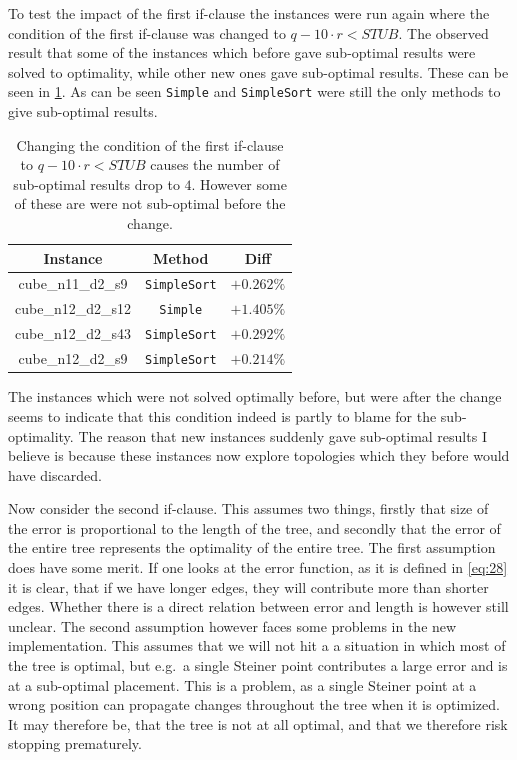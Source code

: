 To test the impact of the first if-clause the instances were run again where the
condition of the first if-clause was changed to $q - 10 \cdot r <
\textit{STUB}$. The observed result that some of the instances which before gave
sub-optimal results were solved to optimality, while other new ones gave
sub-optimal results. These can be seen in \cref{tab:correctness-errors-4}. As
can be seen \texttt{Simple} and \texttt{SimpleSort} were still the only methods
to give sub-optimal results.

\begin{table}[htbp]
  \centering
  \begin{tabular}{ccc}
    \toprule
    Instance           & Method              & Diff       \\
    \midrule
    cube\_n11\_d2\_s9  & \texttt{SimpleSort} & $+0.262\%$ \\
    cube\_n12\_d2\_s12 & \texttt{Simple}     & $+1.405\%$ \\
    cube\_n12\_d2\_s43 & \texttt{SimpleSort} & $+0.292\%$ \\
    cube\_n12\_d2\_s9  & \texttt{SimpleSort} & $+0.214\%$ \\
    \bottomrule
  \end{tabular}
  \caption[Sub-optimal results with condition $q - 10 \cdot r < \textit{STUB}$]{
    Changing the condition of the first if-clause to $q - 10 \cdot r <
    \textit{STUB}$ causes the number of sub-optimal results drop to $4$.
    However some of these are were not sub-optimal before the
    change.\label{tab:correctness-errors-4}}
\end{table}

The instances which were not solved optimally before, but were after the change
seems to indicate that this condition indeed is partly to blame for the
sub-optimality. The reason that new instances suddenly gave sub-optimal results
I believe is because these instances now explore topologies which they before
would have discarded.

Now consider the second if-clause. This assumes two things, firstly that size of
the error is proportional to the length of the tree, and secondly that the error
of the entire tree represents the optimality of the entire tree. The first
assumption does have some merit. If one looks at the error function, as it is
defined in \cref{eq:28} it is clear, that if we have longer edges, they will
contribute more than shorter edges. Whether there is a direct relation between
error and length is however still unclear. The second assumption however faces
some problems in the new implementation. This assumes that we will not hit a
a situation in which most of the tree is optimal, but e.g.\ a single Steiner
point contributes a large error and is at a sub-optimal placement. This is a
problem, as a single Steiner point at a wrong position can propagate changes
throughout the tree when it is optimized. It may therefore be, that the tree is
not at all optimal, and that we therefore risk stopping prematurely.


